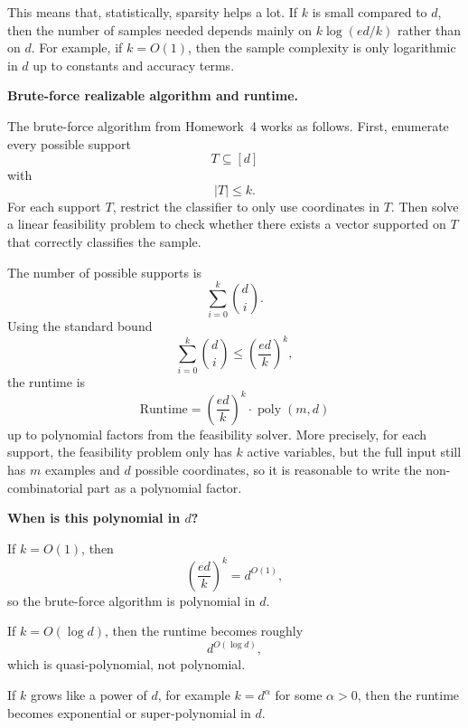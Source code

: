 \documentclass[11pt]{article}
\begin{document}
\begin{enumerate}
\begin{solutionbox}
        This means that, statistically, sparsity helps a lot. If $k$ is small compared to $d$,
        then the number of samples needed depends mainly on $k\log(ed/k)$ rather than on $d$.
        For example, if $k=O(1)$, then the sample complexity is only logarithmic in $d$ up to
        constants and accuracy terms.

        \medskip

        \textbf{Brute-force realizable algorithm and runtime.}

        The brute-force algorithm from Homework~4 works as follows. First, enumerate every
        possible support
        \[
        T\subseteq[d]
        \]
        with
        \[
        |T|\le k.
        \]
        For each support $T$, restrict the classifier to only use coordinates in $T$. Then solve
        a linear feasibility problem to check whether there exists a vector supported on $T$ that
        correctly classifies the sample.

        The number of possible supports is
        \[
        \sum_{i=0}^k {d\choose i}.
        \]
        Using the standard bound
        \[
        \sum_{i=0}^k {d\choose i}
        \le
        \left(\frac{ed}{k}\right)^k,
        \]
        the runtime is
        \[
        \boxed{
        \text{Runtime}
        =
        \left(\frac{ed}{k}\right)^k
        \cdot
        \operatorname{poly}(m,d)
        }
        \]
        up to polynomial factors from the feasibility solver. More precisely, for each support,
        the feasibility problem only has $k$ active variables, but the full input still has $m$
        examples and $d$ possible coordinates, so it is reasonable to write the non-combinatorial
        part as a polynomial factor.

        \medskip

        \textbf{When is this polynomial in $d$?}

        If $k=O(1)$, then
        \[
        \left(\frac{ed}{k}\right)^k
        =
        d^{O(1)},
        \]
        so the brute-force algorithm is polynomial in $d$.

        If $k=O(\log d)$, then the runtime becomes roughly
        \[
        d^{O(\log d)},
        \]
        which is quasi-polynomial, not polynomial.

        If $k$ grows like a power of $d$, for example $k=d^\alpha$ for some $\alpha>0$, then
        the runtime becomes exponential or super-polynomial in $d$.

        \medskip


\end{solutionbox}
\end{enumerate}
\end{document}
